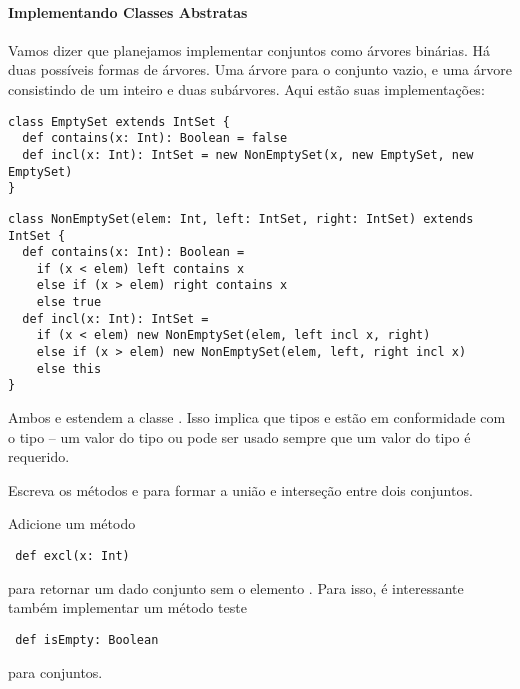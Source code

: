 \paragraph{Implementando Classes Abstratas}

Vamos dizer que planejamos implementar conjuntos como \'{a}rvores bin\'{a}rias. H\'{a} 
duas poss\'{i}veis formas de \'{a}rvores. Uma \'{a}rvore para o conjunto vazio, e uma 
\'{a}rvore consistindo de um inteiro e duas sub\'{a}rvores. Aqui est\~{a}o suas implementa\c{c}\~{o}es:
 
\begin{lstlisting}
class EmptySet extends IntSet {
  def contains(x: Int): Boolean = false
  def incl(x: Int): IntSet = new NonEmptySet(x, new EmptySet, new EmptySet)
}
\end{lstlisting}

\begin{lstlisting}
class NonEmptySet(elem: Int, left: IntSet, right: IntSet) extends IntSet {
  def contains(x: Int): Boolean =
    if (x < elem) left contains x
    else if (x > elem) right contains x
    else true
  def incl(x: Int): IntSet =
    if (x < elem) new NonEmptySet(elem, left incl x, right)
    else if (x > elem) new NonEmptySet(elem, left, right incl x)
    else this
}
\end{lstlisting}
Ambos  e  estendem a classe . Isso implica
que tipos  e  est\~{a}o em conformidade com o tipo  -- 
um valor do tipo  ou  pode ser usado sempre que um valor 
 do tipo  \'{e} requerido.

\begin{exercise}
Escreva os m\'{e}todos  e  para formar a uni\~{a}o e interse\c{c}\~{a}o entre
dois conjuntos.
\end{exercise}
 \begin{exercise} Adicione um m\'{e}todo  
 \begin{lstlisting}
 def excl(x: Int)
 \end{lstlisting}

para retornar um dado conjunto sem o elemento . Para isso, \'{e} interessante tamb\'{e}m 
implementar um m\'{e}todo teste
 \begin{lstlisting}
 def isEmpty: Boolean
 \end{lstlisting}
para conjuntos.
 \end{exercise}

